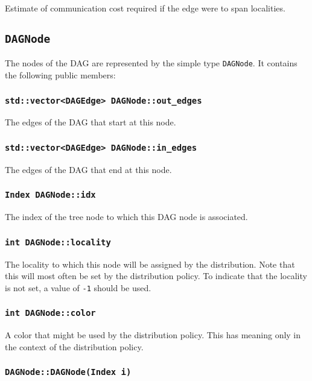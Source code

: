 Estimate of communication cost required if the edge were to span localities.


\subsection{\texttt{DAGNode}}

The nodes of the DAG are represented by the simple type \texttt{DAGNode}. It
contains the following public members:

\subsubsection{\texttt{std::vector<DAGEdge> DAGNode::out\_edges}}

The edges of the DAG that start at this node.

\subsubsection{\texttt{std::vector<DAGEdge> DAGNode::in\_edges}}

The edges of the DAG that end at this node.

\subsubsection{\texttt{Index DAGNode::idx}}

The index of the tree node to which this DAG node is associated.

\subsubsection{\texttt{int DAGNode::locality}}

The locality to which this node will be assigned by the distribution. Note
that this will most often be set by the distribution policy. To indicate that
the locality is not set, a value of \texttt{-1} should be used.

\subsubsection{\texttt{int DAGNode::color}}

A color that might be used by the distribution policy. This has meaning only
in the context of the distribution policy.

\subsubsection{\texttt{DAGNode::DAGNode(Index i)}}

